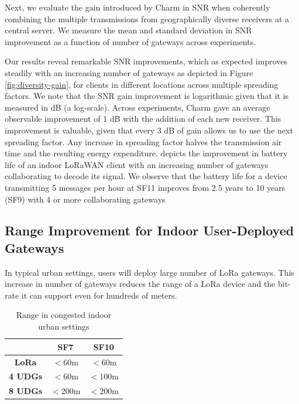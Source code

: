 Next, we evaluate the  gain introduced by Charm in SNR when coherently combining the multiple transmissions from geographically diverse receivers at a central server.    We measure the mean and standard deviation in SNR improvement as a function of number of gateways across experiments.  

Our results reveal remarkable SNR improvements, which as expected improves steadily with an increasing number of gateways as depicted in Figure \ref{fig:diversity-gain}, for clients in different locations across multiple spreading factors. We note that the SNR gain improvement is logarithmic given that it is measured in dB (a log-scale). Across experiments, Charm gave an average observable improvement of 1 dB with the addition of each new receiver. This improvement is valuable, given that every 3 dB of gain allows us to use the next spreading factor. Any increase in spreading factor halves the transmission air time and the resulting energy expenditure.  depicts the improvement in battery life of an indoor LoRaWAN client with an increasing number of gateways collaborating to decode its signal. We observe that the battery life for a device transmitting 5 messages per hour at SF11 improves from 2.5 years to 10 years (SF9) with 4 or more collaborating gateways


\subsection{Range Improvement for Indoor User-Deployed Gateways}
\label{sec:indoor-udgs}
In typical urban settings, users will deploy large number of LoRa gateways. This increase in number of gateways reduces the range of a LoRa device and the bit-rate it can support even for hundreds of meters. 


\begin{table}
\centering \begin{tabular}{||c | c | c||} 
 \hline
  & \textbf{SF7} & \textbf{SF10} \\ [0.5ex] 
 \hline\hline
 \textbf{LoRa} & $<$60m & $<$60m  \\ 
 \hline
 \textbf{4 UDGs} & $<$60m & $<$100m  \\
 \hline
 \textbf{8 UDGs} & $<$200m & $<$200m \\
 \hline
\end{tabular}
\caption{Range in congested indoor urban settings}
\label{tab:range}
\vspace*{-0.1in}
\end{table}

